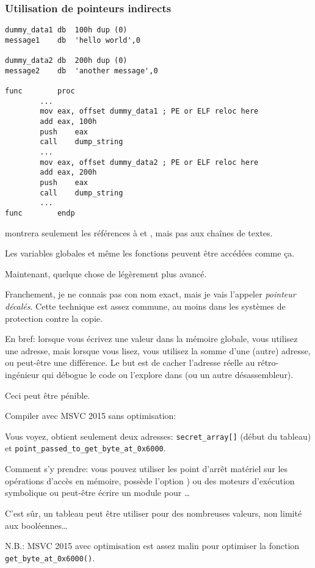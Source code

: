 \subsubsection{Utilisation de pointeurs indirects}

\begin{lstlisting}[style=customasmx86]
dummy_data1	db	100h dup (0)
message1	db	'hello world',0

dummy_data2	db	200h dup (0)
message2	db	'another message',0

func		proc
		...
		mov	eax, offset dummy_data1 ; PE or ELF reloc here
		add	eax, 100h
		push	eax
		call	dump_string
		...
		mov	eax, offset dummy_data2 ; PE or ELF reloc here
		add	eax, 200h
		push	eax
		call	dump_string
		...
func		endp
\end{lstlisting}

\IDA{} montrera seulement les références à  et ,
mais pas aux chaînes de textes.

Les variables globales et même les fonctions peuvent être accédées comme ça.

Maintenant, quelque chose de légèrement plus avancé.

Franchement, je ne connais pas con nom exact, mais je vais l'appeler \textit{pointeur décalés}.
Cette technique est assez commune, au moins dans les systèmes de protection contre
la copie.

En bref: lorsque vous écrivez une valeur dans la mémoire globale, vous utilisez
une adresse, mais lorsque vous lisez, vous utilisez la somme d'une (autre) adresse,
ou peut-être une différence.
Le but est de cacher l'adresse réelle au rétro-ingénieur qui débogue le code ou
l'explore dans \IDA (ou un autre désassembleur).

Ceci peut être pénible.



Compiler avec MSVC 2015 sans optimisation:



Vous voyez, \IDA obtient seulement deux adresses: \verb|secret_array[]| (début du
tableau) et \verb|point_passed_to_get_byte_at_0x6000|.

Comment s'y prendre: vous pouvez utiliser les point d'arrêt matériel sur les opérations
d'accès en mémoire, \tracer possède l'option ) ou des moteurs d'exécution
symbolique ou peut-être écrire un module pour \IDA\dots

C'est sûr, un tableau peut être utiliser pour des nombreuses valeurs, non limité
aux booléennes\dots

N.B.: MSVC 2015 avec optimisation est assez malin pour optimiser la fonction \verb|get_byte_at_0x6000()|.


